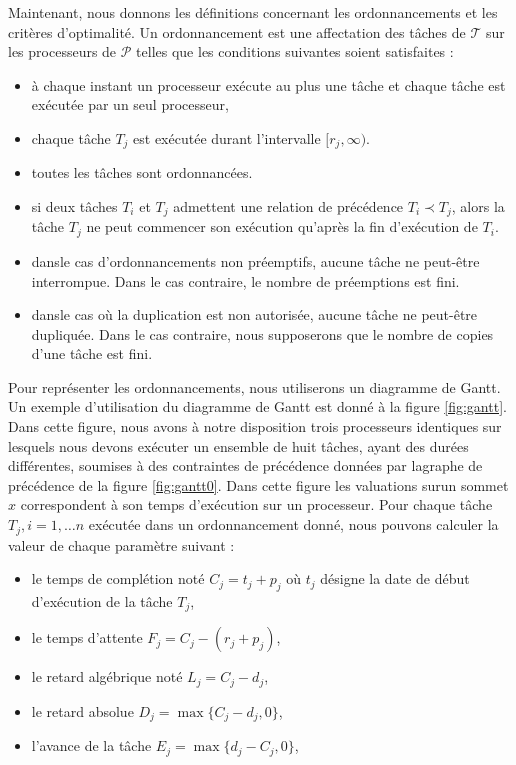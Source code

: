 \documentclass[a4paper,11pt]{article}
\begin{document}
Maintenant, nous donnons les définitions concernant les ordonnancements et les critères
d'optimalité. Un ordonnancement est une affectation des tâches de $\mathcal{T}$ sur les processeurs
de $\mathcal{P}$ telles que les conditions suivantes soient satisfaites :
\begin{itemize}
    \item à chaque instant un processeur exécute au plus une tâche et chaque tâche est exécutée par un seul processeur,

    \item chaque tâche $T_j$ est exécutée durant l'intervalle $[r_j,\infty)$.
    \item toutes les tâches sont ordonnancées.
    \item si deux tâches $T_i$ et $T_j$ admettent une relation de précédence $T_i \prec T_j$,
        alors la tâche $T_j$ ne peut commencer son exécution qu'après la fin d'exécution de
        $T_i$.
    \item dansle cas d'ordonnancements non préemptifs, aucune tâche ne peut-être interrompue.
        Dans le cas contraire, le nombre de préemptions est fini.
    \item dansle cas où la duplication est non autorisée, aucune tâche ne peut-être dupliquée.
        Dans le cas contraire, nous supposerons que le nombre de copies d'une tâche est fini.
\end{itemize}



Pour représenter les ordonnancements, nous utiliserons un diagramme de Gantt. Un exemple
d'utilisation du diagramme de Gantt est donné à la figure \ref{fig:gantt}. Dans cette figure,
nous avons à notre disposition trois processeurs identiques sur lesquels nous devons exécuter un
ensemble de huit tâches, ayant des durées différentes, soumises à des contraintes de précédence
données par lagraphe de précédence de la figure \ref{fig:gantt0}. Dans cette figure les
valuations surun sommet $x$ correspondent à son temps d'exécution sur un processeur. Pour
chaque tâche $T_j, i=1,\ldots n$ exécutée dans un ordonnancement donné, nous pouvons calculer la
valeur de chaque paramètre suivant :


\begin{itemize}
    \item le temps de  complétion noté $C_j=t_j+p_j$ où $t_j$ désigne la date de début d'exécution de la tâche $T_j$,
    \item le temps d'attente $F_j=C_j-(r_j+p_j)$,
    \item le retard algébrique noté $L_j=C_j-d_j$,
    \item le retard absolue $D_j=\max\{C_j-d_j,0\}$,
    \item l'avance de la tâche $E_j=\max\{d_j-C_j,0\}$,
\end{itemize}
\end{document}
